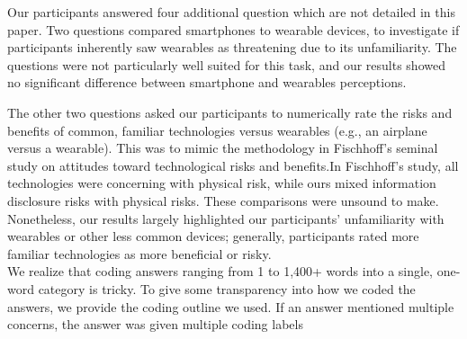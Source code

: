 \label{sec:noquestions}
Our participants answered four additional question which are not detailed in this paper. Two questions compared smartphones to wearable devices, to investigate if participants inherently saw wearables as threatening due to its unfamiliarity. The questions were not particularly well suited for this task, and our results showed no significant difference between smartphone and wearables perceptions. 

The other two questions asked our participants to numerically rate the risks and benefits of common, familiar technologies versus wearables (e.g., an airplane versus a wearable). This was to mimic the methodology in Fischhoff's seminal study on attitudes toward technological risks and benefits.In Fischhoff's study, all technologies were concerning with physical risk, while ours mixed information disclosure risks with physical risks. These comparisons were unsound to make. Nonetheless, our results largely highlighted our participants' unfamiliarity with wearables or other less common devices; generally, participants rated more familiar technologies as more beneficial or risky. \\


\label{sec:coding}
We realize that coding answers ranging from 1 to 1,400+ words into a single, one-word category is tricky. To give some transparency into how we coded the answers, we provide the coding outline we used. If an answer mentioned multiple concerns, the answer was given multiple coding labels\\

